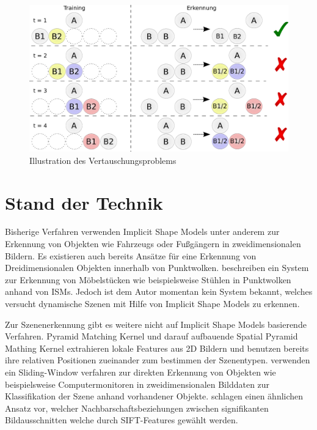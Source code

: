 \begin{figure}
  \centering
  \includegraphics[width=1\textwidth]{bilder/vertauschungsproblem.pdf}
  \caption{Illustration des Vertauschungsproblems}
  \label{fig:vertauschung}
\end{figure}

\section{Stand der Technik}

Bisherige Verfahren verwenden Implicit Shape Models unter anderem zur Erkennung von Objekten wie Fahrzeugs oder Fußgängern in zweidimensionalen Bildern.
Es existieren auch bereits Ansätze für eine Erkennung von Dreidimensionalen Objekten innerhalb von Punktwolken.
\citeauthor{wittrowski20133d} beschreiben ein System zur Erkennung von Möbelstücken wie beispielsweise Stühlen in Punktwolken anhand von ISMs.
Jedoch ist dem Autor momentan kein System bekannt, welches versucht dynamische Szenen mit Hilfe von Implicit Shape Models zu erkennen.

Zur Szenenerkennung gibt es weitere nicht auf Implicit Shape Models basierende Verfahren.
Pyramid Matching Kernel und darauf aufbauende Spatial Pyramid Mathing Kernel  extrahieren lokale Features aus 2D Bildern und benutzen bereits ihre relativen Positionen zueinander zum bestimmen der Szenentypen.
\citeauthor{5509682} verwenden ein Sliding-Window verfahren zur direkten Erkennung von Objekten wie beispielsweise Computermonitoren in zweidimensionalen Bilddaten zur Klassifikation der Szene anhand vorhandener Objekte.
\citeauthor{cakir2011nearest} schlagen einen ähnlichen Ansatz vor, welcher Nachbarschaftsbeziehungen zwischen signifikanten Bildausschnitten welche durch SIFT-Features gewählt werden.